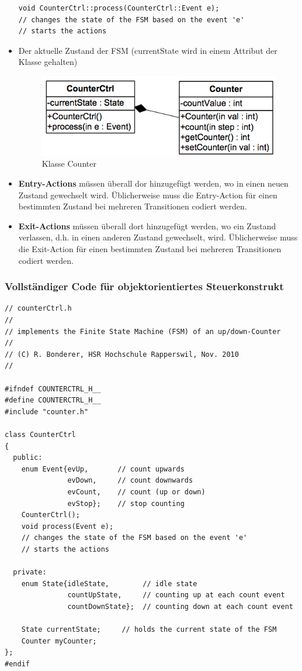 \begin{itemize}
\begin{lstlisting}[style=Cpp]
void CounterCtrl::process(CounterCtrl::Event e); 
// changes the state of the FSM based on the event 'e' 
// starts the actions
\end{lstlisting}
\item Der aktuelle Zustand der FSM (currentState wird in einem Attribut der
Klasse gehalten)
\begin{figure}[h]
  \centering
  {\includegraphics[scale = 0.4]{images/FSM/klasseCounter}  
  \caption{Klasse Counter}
  \label{fig:klasseCounter}}
\end{figure}
\item \textbf{Entry-Actions} müssen überall dor hinzugefügt werden, wo in einen
neuen Zustand gewechselt wird. Üblicherweise muss die Entry-Action für einen
bestimmten Zustand bei mehreren Transitionen codiert werden.
\item \textbf{Exit-Actions} müssen überall dort hinzugefügt werden, wo ein
Zustand verlassen, d.h. in einen anderen Zustand gewechselt, wird. Üblicherweise
muss die Exit-Action für einen bestimmten Zustand bei mehreren Transitionen
codiert werden.
\end{itemize}

\subsubsection{Vollständiger Code für objektorientiertes Steuerkonstrukt}
\label{subsec:oo_code}
\begin{lstlisting}[style=Cpp]
// counterCtrl.h
//
// implements the Finite State Machine (FSM) of an up/down-Counter
//
// (C) R. Bonderer, HSR Hochschule Rapperswil, Nov. 2010
//

#ifndef COUNTERCTRL_H__
#define COUNTERCTRL_H__
#include "counter.h"

class CounterCtrl
{
  public:
    enum Event{evUp,       // count upwards
               evDown,     // count downwards
               evCount,    // count (up or down)
               evStop};    // stop counting
    CounterCtrl();
    void process(Event e);
    // changes the state of the FSM based on the event 'e'
    // starts the actions

  private:
    enum State{idleState,        // idle state
               countUpState,     // counting up at each count event
               countDownState};  // counting down at each count event

    State currentState;     // holds the current state of the FSM
    Counter myCounter;
};
#endif
\end{lstlisting}

